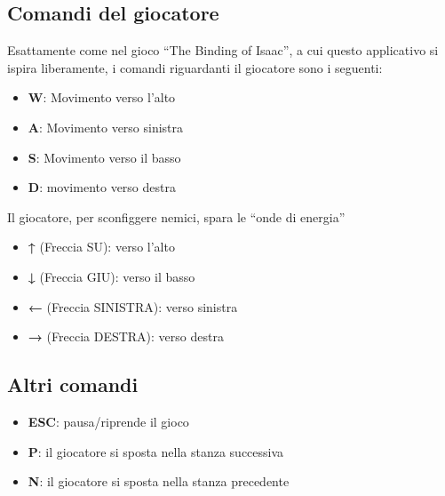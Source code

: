 \documentclass[a4paper,12pt]{report}
\begin{document}
\subsection*{Comandi del giocatore}
Esattamente come nel gioco ``The Binding of Isaac'', a cui questo applicativo si ispira liberamente, i comandi riguardanti il giocatore sono i seguenti:
\begin{itemize}
    \item \textbf{W}: Movimento verso l'alto
    \item \textbf{A}: Movimento verso sinistra
    \item \textbf{S}: Movimento verso il basso
    \item \textbf{D}: movimento verso destra
\end{itemize}
Il giocatore, per sconfiggere nemici, spara le ``onde di energia''
\begin{itemize}
    \item \textbf{↑} (Freccia SU): verso l'alto
    \item \textbf{↓} (Freccia GIU): verso il basso
    \item \textbf{←} (Freccia SINISTRA): verso sinistra
    \item \textbf{→} (Freccia DESTRA): verso destra
\end{itemize}

\subsection*{Altri comandi}
\begin{itemize}
    \item \textbf{ESC}: pausa/riprende il gioco
    \item \textbf{P}: il giocatore si sposta nella stanza successiva
    \item \textbf{N}: il giocatore si sposta nella stanza precedente
\end{itemize}

\newpage
\end{document}
